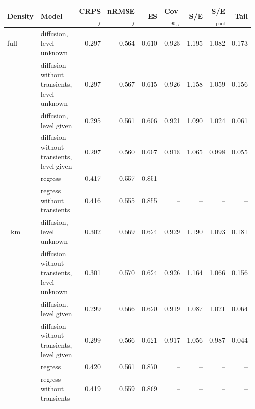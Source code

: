 \begin{tabular}{llrrrrrrr}
\toprule
Density & Model & CRPS$_f$ & nRMSE$_f$ & ES & Cov.$_{90,f}$ & S/E & S/E$_\mathrm{pool}$ & Tail \\
\midrule
full & diffusion, level unknown & 0.297 & 0.564 & 0.610 & 0.928 & 1.195 & 1.082 & 0.173 \\
 & diffusion without transients, level unknown & 0.297 & 0.567 & 0.615 & 0.926 & 1.158 & 1.059 & 0.156 \\
 & diffusion, level given & 0.295 & 0.561 & 0.606 & 0.921 & 1.090 & 1.024 & 0.061 \\
 & diffusion without transients, level given & 0.297 & 0.560 & 0.607 & 0.918 & 1.065 & 0.998 & 0.055 \\
 & regress & 0.417 & 0.557 & 0.851 & -- & -- & -- & -- \\
 & regress without transients & 0.416 & 0.555 & 0.855 & -- & -- & -- & -- \\
\addlinespace
60~km & diffusion, level unknown & 0.302 & 0.569 & 0.624 & 0.929 & 1.190 & 1.093 & 0.181 \\
 & diffusion without transients, level unknown & 0.301 & 0.570 & 0.624 & 0.926 & 1.164 & 1.066 & 0.156 \\
 & diffusion, level given & 0.299 & 0.566 & 0.620 & 0.919 & 1.087 & 1.021 & 0.064 \\
 & diffusion without transients, level given & 0.299 & 0.566 & 0.621 & 0.917 & 1.056 & 0.987 & 0.044 \\
 & regress & 0.420 & 0.561 & 0.870 & -- & -- & -- & -- \\
 & regress without transients & 0.419 & 0.559 & 0.869 & -- & -- & -- & -- \\
\bottomrule
\end{tabular}
